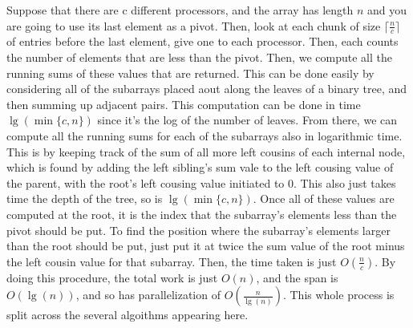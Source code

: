 \documentclass{article}
\begin{document}
Suppose that there are c different processors, and the array has length $n$ and you are going to use its last element as a pivot. Then, look at each chunk of size $\lceil\frac{n}{c}\rceil$ of entries before the last element, give one to each processor. Then, each counts the number of elements that are less than the pivot. Then, we compute all the running sums of these values that are returned. This can be done easily by considering all of the subarrays placed aout along the leaves of a binary tree, and then summing up adjacent pairs. This computation can be done in time $\lg(\min\{c,n\})$ since it's the log of the number of leaves. From there, we can compute all the running sums for each of the subarrays also in logarithmic time. This is by keeping track of the sum of all more left cousins of each internal node, which is found by adding the left sibling's sum vale to the left cousing value of the parent, with the root's left cousing value initiated to 0. This also just takes time the depth of the tree, so is $\lg(\min\{c,n\})$. Once all of these values are computed at the root, it is the index that the subarray's elements less than the pivot should be put. To find the position where the subarray's elements larger than the root should be put, just put it at twice the sum value of the root minus the left cousin value for that subarray. Then, the time taken is just $O(\frac{n}{c})$. By doing this procedure, the total work is just $O(n)$, and the span is $O(\lg(n))$, and so has parallelization of $O(\frac{n}{\lg(n)})$. This whole process is split across the several algoithms appearing here.\\
\end{document}
